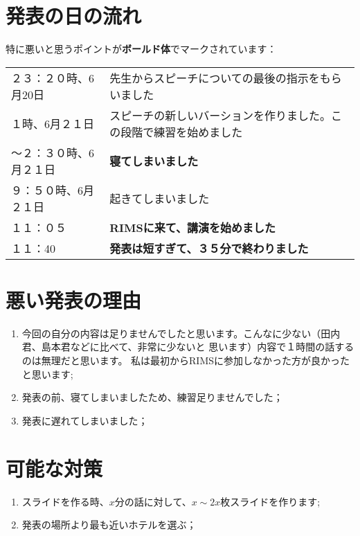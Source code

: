 \documentclass[12pt]{article} %
\begin{document}
\section{発表の日の流れ}
特に悪いと思うポイントが\textbf{ボールド体}でマークされています：
\begin{center}
	\begin{tabular}[]{lp{}}
		２３：２０時、6月20日&先生からスピーチについての最後の指示をもらいました\\
		１時、6月２１日&スピーチの新しいバーションを作りました。この段階で練習を始めました\\
		〜２：３０時、6月２１日&{\bf 寝てしまいました}\\
		９：５０時、6月２１日&起きてしまいました\\
		１１：０５&{\bf RIMSに来て、講演を始めました}\\
		１１：40&{\bf 発表は短すぎて、３５分で終わりました}\\
	\end{tabular}
\end{center}
\section{悪い発表の理由}
\begin{enumerate}
	\item 今回の自分の内容は足りませんでしたと思います。こんなに少ない（田内君、島本君などに比べて、非常に少ないと
		思います）内容で１時間の話するのは無理だと思います。
		私は最初からRIMSに参加しなかった方が良かったと思います;

	\item 発表の前、寝てしまいましたため、練習足りませんでした；
	\item 発表に遅れてしまいました；
\end{enumerate}
\section{可能な対策}
\begin{enumerate}
	\item スライドを作る時、$x$分の話に対して、$x
		\sim{2x}$枚スライドを作ります;
	\item 発表の場所より最も近いホテルを選ぶ；
\end{enumerate}
\end{document}
